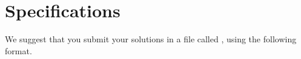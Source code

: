 \section*{Specifications}
We suggest that you submit your solutions in a file called , using the following format.

